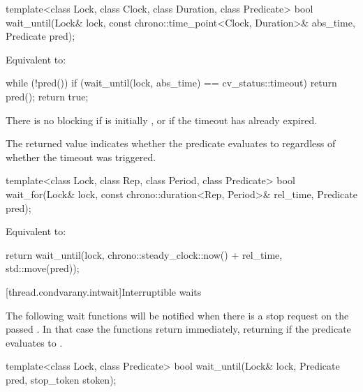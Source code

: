 %
\begin{itemdecl}
template<class Lock, class Clock, class Duration, class Predicate>
  bool wait_until(Lock& lock, const chrono::time_point<Clock, Duration>& abs_time, Predicate pred);
\end{itemdecl}

\begin{itemdescr}
\pnum
\effects
Equivalent to:
\begin{codeblock}
while (!pred())
  if (wait_until(lock, abs_time) == cv_status::timeout)
    return pred();
return true;
\end{codeblock}

\pnum
\begin{note}
There is no blocking if  is initially , or
if the timeout has already expired.
\end{note}

\pnum
\begin{note}
The returned value indicates whether the predicate evaluates to 
regardless of whether the timeout was triggered.
\end{note}
\end{itemdescr}

%
\begin{itemdecl}
template<class Lock, class Rep, class Period, class Predicate>
  bool wait_for(Lock& lock, const chrono::duration<Rep, Period>& rel_time, Predicate pred);
\end{itemdecl}

\begin{itemdescr}
\pnum
\effects
Equivalent to:
\begin{codeblock}
return wait_until(lock, chrono::steady_clock::now() + rel_time, std::move(pred));
\end{codeblock}
\end{itemdescr}

[thread.condvarany.intwait]{Interruptible waits}

\pnum
The following wait functions will be notified
when there is a stop request on the passed .
In that case the functions return immediately,
returning  if the predicate evaluates to .

\begin{itemdecl}
template<class Lock, class Predicate>
  bool wait_until(Lock& lock, Predicate pred, stop_token stoken);
\end{itemdecl}

